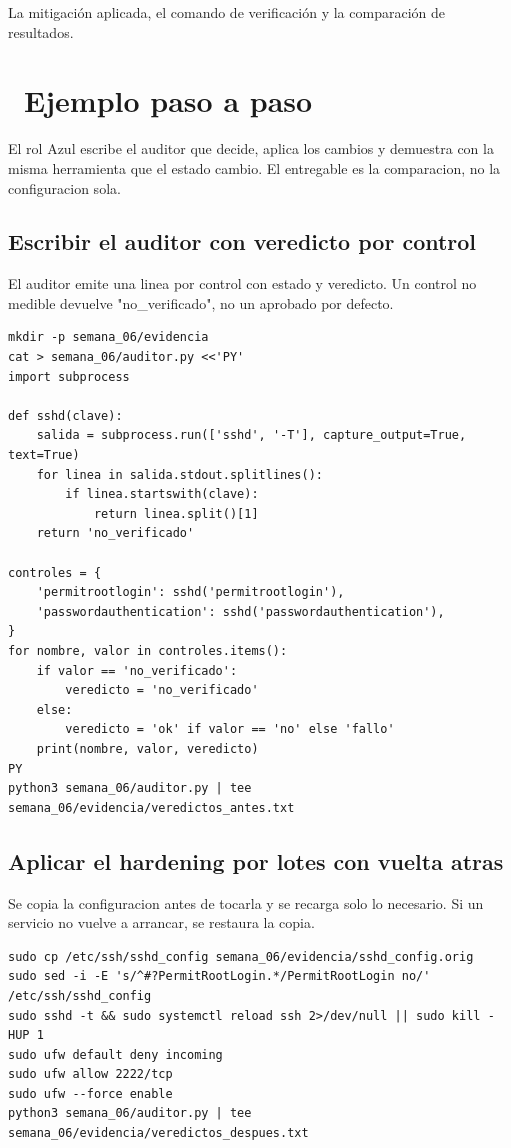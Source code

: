 \documentclass[11pt,a4paper]{article}
\newcommand{\iconotexto}[2]{\textcolor{cyanNeon}{\faIcon{#1}}~#2}
\begin{document}
La mitigación aplicada, el comando de verificación y la comparación de resultados.

\section{\iconotexto{list-ol}{Ejemplo paso a paso}}

El rol Azul escribe el auditor que decide, aplica los cambios y demuestra con la misma herramienta que el estado cambio. El entregable es la comparacion, no la configuracion sola.

\subsection{Escribir el auditor con veredicto por control}

El auditor emite una linea por control con estado y veredicto. Un control no medible devuelve "no\_verificado", no un aprobado por defecto.

\begin{lstlisting}[style=estiloCodigo]
mkdir -p semana_06/evidencia
cat > semana_06/auditor.py <<'PY'
import subprocess

def sshd(clave):
    salida = subprocess.run(['sshd', '-T'], capture_output=True, text=True)
    for linea in salida.stdout.splitlines():
        if linea.startswith(clave):
            return linea.split()[1]
    return 'no_verificado'

controles = {
    'permitrootlogin': sshd('permitrootlogin'),
    'passwordauthentication': sshd('passwordauthentication'),
}
for nombre, valor in controles.items():
    if valor == 'no_verificado':
        veredicto = 'no_verificado'
    else:
        veredicto = 'ok' if valor == 'no' else 'fallo'
    print(nombre, valor, veredicto)
PY
python3 semana_06/auditor.py | tee semana_06/evidencia/veredictos_antes.txt
\end{lstlisting}

\subsection{Aplicar el hardening por lotes con vuelta atras}

Se copia la configuracion antes de tocarla y se recarga solo lo necesario. Si un servicio no vuelve a arrancar, se restaura la copia.

\begin{lstlisting}[style=estiloCodigo]
sudo cp /etc/ssh/sshd_config semana_06/evidencia/sshd_config.orig
sudo sed -i -E 's/^#?PermitRootLogin.*/PermitRootLogin no/' /etc/ssh/sshd_config
sudo sshd -t && sudo systemctl reload ssh 2>/dev/null || sudo kill -HUP 1
sudo ufw default deny incoming
sudo ufw allow 2222/tcp
sudo ufw --force enable
python3 semana_06/auditor.py | tee semana_06/evidencia/veredictos_despues.txt
\end{lstlisting}
\end{document}
